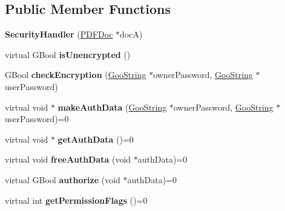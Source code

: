 \subsection*{Public Member Functions}
\begin{DoxyCompactItemize}
\item 
\mbox{\label{class_security_handler_a135a89a3be928b15ff59302beef32812}} 
{\bfseries Security\+Handler} (\hyperlink{class_p_d_f_doc}{P\+D\+F\+Doc} $\ast$docA)
\item 
\mbox{\label{class_security_handler_a8ced59374cd4d8fbafad2bdb2fb02c63}} 
virtual G\+Bool {\bfseries is\+Unencrypted} ()
\item 
\mbox{\label{class_security_handler_a21566fec2c7fc8e2024c7cae46792bec}} 
G\+Bool {\bfseries check\+Encryption} (\hyperlink{class_goo_string}{Goo\+String} $\ast$owner\+Password, \hyperlink{class_goo_string}{Goo\+String} $\ast$user\+Password)
\item 
\mbox{\label{class_security_handler_aeb963c1a78634b029a3bf06c76320a35}} 
virtual void $\ast$ {\bfseries make\+Auth\+Data} (\hyperlink{class_goo_string}{Goo\+String} $\ast$owner\+Password, \hyperlink{class_goo_string}{Goo\+String} $\ast$user\+Password)=0
\item 
\mbox{\label{class_security_handler_aef7cf7e2da0f5e7428a6a1868d67f563}} 
virtual void $\ast$ {\bfseries get\+Auth\+Data} ()=0
\item 
\mbox{\label{class_security_handler_a074c41b9e42184d473c40bb74fb6a381}} 
virtual void {\bfseries free\+Auth\+Data} (void $\ast$auth\+Data)=0
\item 
\mbox{\label{class_security_handler_a9f1656a6cfb386e64d6e54c4ce9dd129}} 
virtual G\+Bool {\bfseries authorize} (void $\ast$auth\+Data)=0
\item 
\mbox{\label{class_security_handler_ab7fc22d0bf5b5ca800cb813e1679d73c}} 
virtual int {\bfseries get\+Permission\+Flags} ()=0
\item 
\mbox{\label{class_security_handler_a109fca0777986ae8e4675ad3b6cc9776}} 

\end{DoxyCompactItemize}
